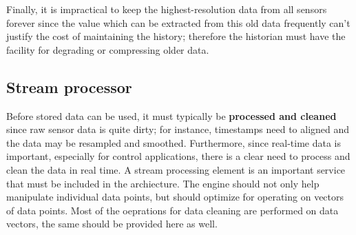 Finally, it is impractical to keep the highest-resolution data from all sensors forever since the value which can be extracted from this old data frequently can't justify the cost of maintaining the history; therefore the historian must have the facility for degrading or compressing older data.


\subsection{Stream processor}
Before stored data can be used, it must typically be {\bf processed and cleaned} since raw sensor data is quite dirty; for instance, timestamps need to aligned and the data may be resampled and smoothed.  Furthermore, since real-time data is important, especially for control applications, there is a clear need to process and clean the data in real time.  A stream processing element is an important service that must be included in the archiecture.  The engine should not only help manipulate individual data points, but should optimize for operating on vectors of data points.  Most of the oeprations for data cleaning are performed on data vectors, the same should be provided here as well.


